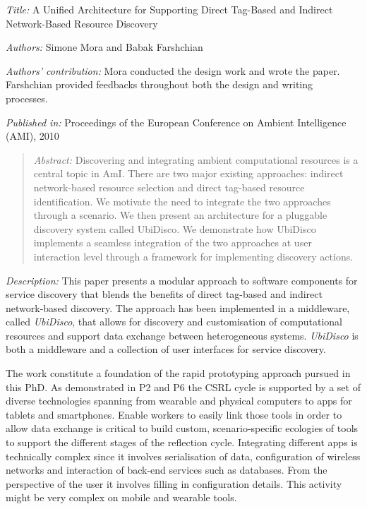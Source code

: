 \emph{Title:} A Unified Architecture for Supporting Direct Tag-Based and Indirect Network-Based Resource Discovery

\emph{Authors:} Simone Mora and Babak Farshchian

\emph{Authors' contribution:} Mora conducted the design work and wrote the paper. Farshchian provided feedbacks throughout both the design and writing processes.~

\emph{Published in:} Proceedings of the European Conference on Ambient Intelligence (AMI), 2010
\begin{quote}
	\emph{Abstract:} Discovering and integrating ambient computational resources is a central topic in AmI. There are two major existing approaches: indirect network-based resource selection and direct tag-based resource identification. We motivate the need to integrate the two approaches through a scenario. We then present an architecture for a pluggable discovery system called UbiDisco. We demonstrate how UbiDisco implements a seamless integration of the two approaches at user interaction level through a framework for implementing discovery actions. 
\end{quote}

\emph{Description:} This paper presents a modular approach to software components for service discovery that blends the benefits of direct tag-based and indirect network-based discovery. The approach has been implemented in a middleware, called \emph{UbiDisco}, that allows for discovery and customisation of computational resources and support data exchange between heterogeneous systems. \emph{UbiDisco} is both a middleware and a collection of user interfaces for service discovery.

The work constitute a foundation of the rapid prototyping approach pursued in this PhD. As demonstrated in P2 and P6 the CSRL cycle is supported by a set of diverse technologies spanning from wearable and physical computers to apps for tablets and smartphones. Enable workers to easily link those tools in order to allow data exchange is critical to build custom, scenario-specific ecologies of tools to support the different stages of the reflection cycle. Integrating different apps is technically complex since it involves serialisation of data, configuration of wireless networks and interaction of back-end services such as databases. From the perspective of the user it involves filling in configuration details. This activity might be very complex on mobile and wearable tools.

